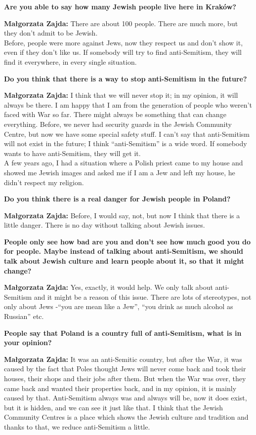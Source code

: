 \textbf{Are you able to say how many Jewish people live here in Kraków?} 

\textbf{Małgorzata Zajda:} There are about 100 people. There are much more, but they don't admit to be Jewish.\\ 
Before, people were more against Jews, now they respect us and don't show it, even if they don't like us. If somebody will try to find anti-Semitism, they will find it everywhere, in every single situation. 

\textbf{Do you think that there is a way to stop anti-Semitism in the future?} 

\textbf{Małgorzata Zajda:} I think that we will never stop it; in my opinion, it will always be there. I am happy that I am from the generation of people who weren’t faced with War so far. There might always be something that can change everything. Before, we never had security guards in the Jewish Community Centre, but now we have some special safety stuff. I can't say that anti-Semitism will not exist in the future; I think ``anti-Semitism'' is a wide word. If somebody wants to have anti-Semitism, they will get it.\\ 
A few years ago, I had a situation where a Polish priest came to my house and showed me Jewish images and asked me if I am a Jew and left my house, he didn't respect my religion.  

\textbf{Do you think there is a real danger for Jewish people in Poland?}  

\textbf{Małgorzata Zajda:} Before, I would say, not, but now I think that there is a little danger. There is no day without talking about Jewish issues.  

\textbf{People only see how bad are you and don't see how much good you do for people. Maybe instead of talking about anti-Semitism, we should talk about Jewish culture and learn people about it, so that it might change?} 

\textbf{Małgorzata Zajda:} Yes, exactly, it would help. We only talk about anti-Semitism and it might be a reason of this issue.  
There are lots of stereotypes, not only about Jews -``you are mean like a Jew'', ``you drink as much alcohol as Russian'' etc.  

\textbf{People say that Poland is a country full of anti-Semitism, what is in your opinion?} 

\textbf{Małgorzata Zajda:} It was an anti-Semitic country, but after the War, it was caused by the fact that Poles thought Jews will never come back and took their houses, their shops and their jobs after them. But when the War was over, they came back and wanted their properties back, and in my opinion, it is mainly caused by that. Anti-Semitism always was and always will be, now it does exist, but it is hidden, and we can see it just like that.  
I think that the Jewish Community Centres is a place which shows the Jewish culture and tradition and thanks to that, we reduce anti-Semitism a little.  

